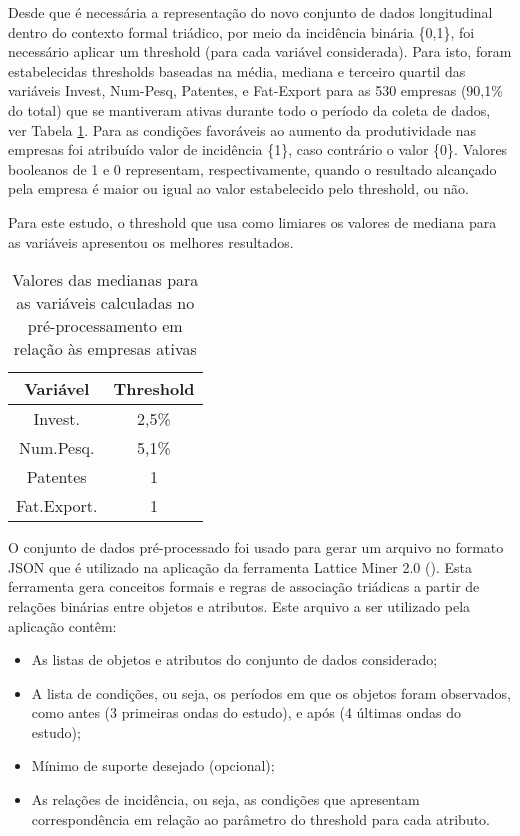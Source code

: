 \documentclass[kdmile,a4paper]{kdmile} %
\begin{document}
Desde que é necessária a representação do novo conjunto de dados longitudinal dentro do contexto formal triádico, por meio da incidência binária \{0,1\}, foi necessário aplicar um threshold (para cada variável considerada). Para isto, foram estabelecidas thresholds baseadas na média, mediana e terceiro quartil das variáveis Invest, Num-Pesq, Patentes, e Fat-Export para as 530 empresas (90,1\% do total) que se mantiveram ativas durante todo o período da coleta de dados, ver Tabela \ref{tabela:1}. Para as condições favoráveis ao aumento da produtividade nas empresas foi atribuído valor de incidência \{1\}, caso contrário o valor \{0\}. Valores booleanos de 1 e 0 representam, respectivamente, quando o resultado alcançado pela empresa é maior ou igual ao valor estabelecido pelo threshold, ou não.

Para este estudo, o threshold que usa como limiares os valores de mediana para as variáveis apresentou os melhores resultados.

\begin{table}[ht!]
    \centering
    \begin{tabular}{||c c||} 
         \hline
         Variável & Threshold \\ [0.5ex] 
         \hline\hline
         Invest. & 2,5\% \\
         Num.Pesq. & 5,1\% \\
         Patentes & 1 \\
         Fat.Export. & 1 \\ [1ex] 
         \hline
    \end{tabular}
    \caption{Valores das medianas para as variáveis calculadas no pré-processamento em relação às empresas ativas}
    \label{tabela:1}
\end{table}

O conjunto de dados pré-processado foi usado para gerar um arquivo no formato JSON que é utilizado na aplicação da ferramenta Lattice Miner 2.0 (\cite{missaoui2017lattice}). Esta ferramenta gera conceitos formais e regras de associação triádicas a partir de relações binárias entre objetos e atributos. Este arquivo a ser utilizado pela aplicação contêm:

\begin{itemize}
    \item As listas de objetos e atributos do conjunto de dados considerado;
    \item A lista de condições, ou seja, os períodos em que os objetos foram observados, como antes (3 primeiras ondas do estudo), e após (4 últimas ondas do estudo);
    \item Mínimo de suporte desejado (opcional);
    \item As relações de incidência, ou seja, as condições que apresentam correspondência em relação ao parâmetro do threshold para cada atributo.
\end{itemize}
\end{document}
